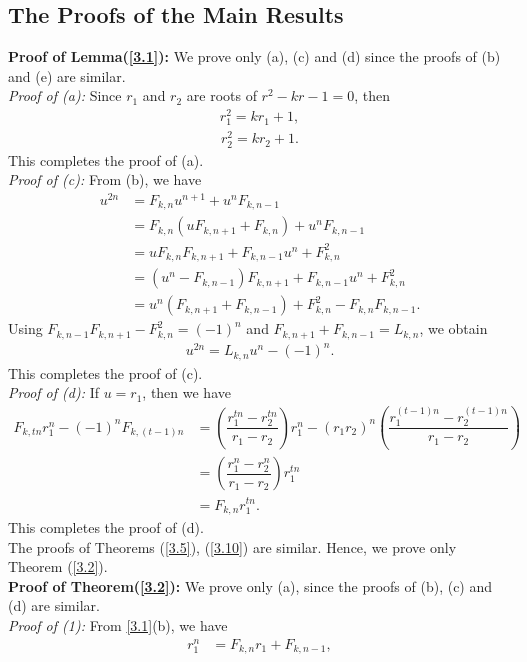 \subsection*{{The Proofs of the Main Results}}
\textbf{Proof of Lemma(\ref{3.1}):} We prove only (a), (c) and (d) since the proofs of (b) and (e) are similar.\\
\textit{Proof of (a):}
Since $r_1$ and $r_2$ are roots of $r^2-kr-1=0$, then
\begin{align}\label{4.1}
r_1^2=kr_1+1,
\end{align}
\begin{align}\label{4.2}
r_2^2=kr_2+1.
\end{align}
This completes the proof of (a).\\
\textit{Proof of (c):}
From (b), we have
\begin{align*}
u^{2n}&=F_{k,n}u^{n+1}+u^nF_{k,n-1}\\
&=F_{k,n}(uF_{k,n+1}+F_{k,n})+u^nF_{k,n-1}\\
&=uF_{k,n}F_{k,n+1}+F_{k,n-1}u^n+F_{k,n}^2\\
&=(u^n-F_{k,n-1})F_{k,n+1}+F_{k,n-1}u^n+F_{k,n}^2\\
&=u^n(F_{k,n+1}+F_{k,n-1})+F_{k,n}^2-F_{k,n}F_{k,n-1}.
\end{align*}
Using $F_{k,n-1}F_{k,n+1}-F_{k,n}^2=(-1)^n$ and $F_{k,n+1}+F_{k,n-1}=L_{k,n}$, we obtain
\begin{align*}
u^{2n}=L_{k,n}u^n-(-1)^n.
\end{align*}
This completes the proof of (c).\\
\textit{Proof of (d):}
If $u=r_1$, then we have
\begin{align*}
F_{k,tn}r_1^n-(-1)^nF_{k,(t-1)n}&=(\dfrac{r_1^{tn}-r_2^{tn}}{r_1-r_2})r_1^{n}-(r_1r_2)^n(\dfrac{r_1^{(t-1)n}-r_2^{(t-1)n}}{r_1-r_2})\\
&=(\dfrac{r_1^{n}-r_2^{n}}{r_1-r_2})r_1^{tn}\\
&=F_{k,n}r_1^{tn}.
\end{align*}
This completes the proof of (d).\\
The proofs of Theorems (\ref{3.5}), (\ref{3.10}) are similar. Hence, we prove only Theorem (\ref{3.2}).\\
\textbf{Proof of Theorem(\ref{3.2}):} We prove only (a), since the proofs of (b), (c) and (d) are similar.\\
\textit{Proof of (1):}
From \ref{3.1}(b), we have
\begin{align}\label{4.3}
r_1^{n}&=F_{k,n}r_1+F_{k,n-1},
\end{align}
